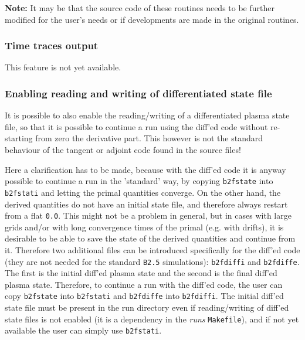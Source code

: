 \textbf{Note:} It may be that the source code of these routines needs to be further modified for the user's needs or if developments are made in the original routines.

\subsubsection{Time traces output}

This feature is not yet available.

\subsubsection{Enabling reading and writing of differentiated state file}

It is possible to also enable the reading/writing of a differentiated plasma state file, so that it is possible to continue a run using the diff'ed code without re-starting from zero the derivative part. This however is not the standard behaviour of the tangent or adjoint code found in the source files!

Here a clarification has to be made, because with the diff'ed code it is anyway possible to continue a run in the 'standard' way, by copying {\tt b2fstate} into {\tt b2fstati} and letting the primal quantities converge. On the other hand, the derived quantities do not have an initial state file, and therefore always restart from a flat {\tt 0.0}. This might not be a problem in general, but in cases with large grids and/or with long convergence times of the primal (e.g. with drifts), it is desirable to be able to save the state of the derived quantities and continue from it. Therefore two additional files can be introduced specifically for the diff'ed code (they are not needed for the standard {\tt B2.5} simulations): {\tt b2fdiffi} and {\tt b2fdiffe}. The first is the initial diff'ed plasma state and the second is the final diff'ed plasma state. Therefore, to continue a run with the diff'ed code, the user can copy {\tt b2fstate} into {\tt b2fstati} and {\tt b2fdiffe} into {\tt b2fdiffi}. The initial diff'ed state file must be present in the run directory even if reading/writing of diff'ed state files is not enabled (it is a dependency in the {\it runs} {\tt Makefile}), and if not yet available the user can simply use {\tt b2fstati}.

